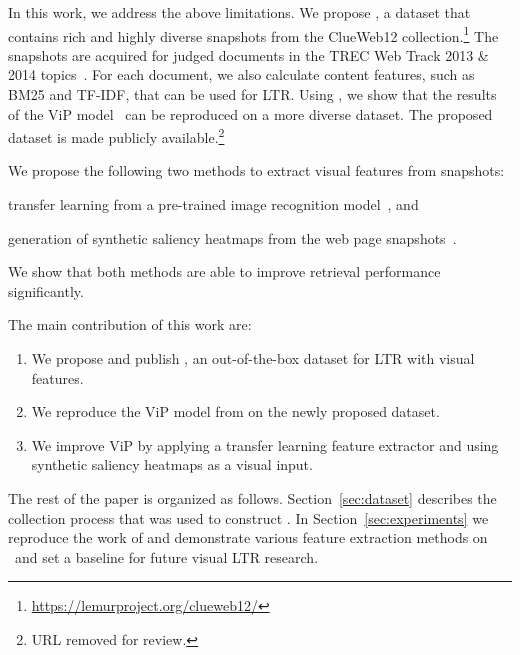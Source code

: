In this work, we address the above limitations.
We propose \datasetname, a dataset that contains rich and highly diverse snapshots from the ClueWeb12 collection.\footnote{\url{https://lemurproject.org/clueweb12/}} The snapshots are acquired for judged documents in the TREC Web Track 2013 \& 2014 topics~\cite{collins2013trec,collins2015trec}. For each document, we also calculate content features, such as BM25 and TF-IDF, that can be used for \ac{LTR}.
%
Using \datasetname, we show that the results of the ViP model~\citep{fan2017learning} can be reproduced on a more diverse dataset.
The proposed dataset is made publicly available.\footnote{URL removed for review.}

We propose the following two methods to extract visual features from snapshots:
\begin{inparaenum}[(i)]
\item transfer learning from a pre-trained image recognition model~\cite{donahue2014decaf,simonyan2014very}, and
\item generation of synthetic saliency heatmaps from the web page snapshots~\cite{shen2014webpage,shan2017two}.
\end{inparaenum}
We show that both methods are able to improve retrieval performance significantly.

The main contribution of this work are:
\begin{enumerate}  
\item We propose and publish \datasetname, an out-of-the-box dataset for \ac{LTR} with visual features.
\item We reproduce the ViP model from \cite{fan2017learning} on the newly proposed dataset.
\item We improve ViP by applying a transfer learning feature extractor and using synthetic saliency heatmaps as a visual input.
\end{enumerate}
 The rest of the paper is organized as follows. Section~\ref{sec:dataset} describes the collection process that was used to construct \datasetname. In Section~\ref{sec:experiments} we reproduce the work of \citet{fan2017learning} and demonstrate various feature extraction methods on \datasetname~and set a baseline for future visual \ac{LTR} research.  
\fi
